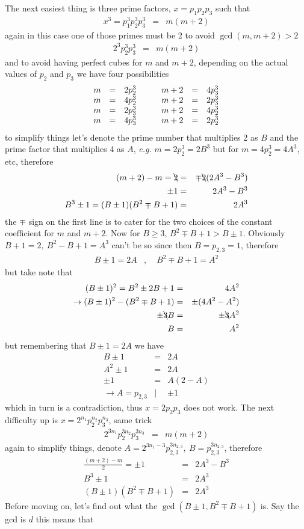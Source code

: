 \documentclass[aps,preprint,preprintnumbers,nofootinbib,showpacs,prd]{revtex4-1}
\newcommand{\eg}{{\it e.g.} }
\newcommand{\ba}{\begin{array}}
\newcommand{\ea}{\end{array}}
\newcommand{\nbea}{\begin{eqnarray*}}
\newcommand{\neea}{\end{eqnarray*}}
\begin{document}
The next easiest thing is three prime factors, $x = p_1p_2p_3$ such that
%
\nbea
x^3 = p_1^{3}p_2^{3}p_3^{3} & = & m(m+2)
\neea
%
again in this case one of those primes must be 2 to avoid $\gcd(m,m+2) > 2$
%
\nbea
2^3 p_2^{3}p_3^{3} & = & m (m + 2)
\neea
%
and to avoid having perfect cubes for $m$ and $m+2$, depending on the actual values of $p_2$ and $p_3$ we have four possibilities
%
\nbea
\ba{r c l c r c l}
m & = & 2 p_2^{3} & ~~~& m+2 & = & 4p_3^3 \\
m & = & 4 p_2^{3} & ~~~& m+2 & = & 2p_3^3 \\
m & = & 2 p_3^{3} & ~~~& m+2 & = & 4p_2^3 \\
m & = & 4 p_3^{3} & ~~~& m+2 & = & 2p_2^3
\ea
\neea
%
to simplify things let's denote the prime number that multiplies 2 as $B$ and the prime factor that multiplies 4 as $A$, \eg $m = 2p_2^3 = 2B^3$ but for $m = 4 p_2^{3} = 4A^3$, etc, therefore
%
\nbea
(m+2) - m = \bcancel{2} & = & \mp \bcancel{2} (2A^3 - B^3) \\
\pm 1 & = & 2A^3 - B^3 \\
B^{3} \pm 1 = (B \pm 1)(B^2 \mp B + 1)& = & 2A^3
\neea
%
the $\mp$ sign on the first line is to cater for the two choices of the constant coefficient for $m$ and $m+2$. Now for $B \ge 3$, $B^2 \mp B + 1 > B \pm 1$. Obviously $B + 1 = 2,~ B^2 - B + 1 = A^3$ can't be so since then $B = p_{2,3} = 1$, therefore
%
\nbea
B \pm 1 = 2A &,~~& B^2 \mp B + 1 = A^2
\neea
%
but take note that
%
\nbea
(B \pm 1)^2 = B^2 \pm 2B + 1 & = & 4 A^2 \\
\to (B \pm 1)^2 - (B^2 \mp B + 1) & = & \pm(4 A^2 - A^2) \\
\pm \bcancel{3} B & = & \pm \bcancel{3} A^2 \\
B & = & A^2
\neea
%
but remembering that $B \pm 1 = 2A$ we have
%
\nbea
B \pm 1 & = & 2A \\
A^2 \pm 1 & = & 2A \\
\pm 1 & = & A (2 - A) \\
\to A =  p_{2,3} &|& \pm 1
\neea
%
which in turn is a contradiction, thus $x = 2 p_2 p_3$ does not work. The next difficulty up is $x = 2^{n_1} p_2^{n_2} p_3^{n_3}$, same trick
%
\nbea
2^{3n_1} p_2^{3n_2}p_3^{3n_3} & = & m (m + 2)
\neea
%
again to simplify things, denote $A = 2^{3n_1-3}p_{2,3}^{3n_{2,3}}, ~ B = p_{2,3}^{3n_{2,3}}$, therefore
%
\nbea
\frac{(m+2) - m}{2} = \pm 1 & = & 2 A^3 - B^3 \\
B^3 \pm 1 & = & 2 A^3 \\
(B \pm 1)(B^2 \mp B + 1) & = & 2 A^3
\neea
%
Before moving on, let's find out what the $\gcd(B \pm 1, B^2 \mp B + 1)$ is. Say the gcd is $d$ this means that
\end{document}
